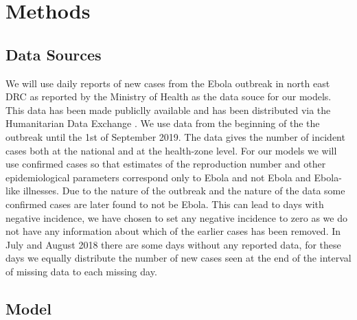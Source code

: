 \documentclass[12pt]{article}
\begin{document}
\section{Methods}

\subsection{Data Sources}

We will use daily reports of new cases from the Ebola outbreak in north east DRC as reported by the Ministry of Health as the data souce for our models. This data has been made publiclly available and has been distributed via the Humanitarian Data Exchange \cite{hummanitariandataexchangeEbolaCasesDeaths}. We use data from the beginning of the the outbreak until the 1st of September 2019. The data gives the number of incident cases both at the national and at the health-zone level. For our models we will use confirmed cases so that estimates of the reproduction number and other epidemiological parameters correspond only to Ebola and not Ebola and Ebola-like illnesses. Due to the nature of the outbreak and the nature of the data some confirmed cases are later found to not be Ebola. This can lead to days with negative incidence, we have chosen to set any negative incidence to zero as we do not have any information about which of the earlier cases has been removed. In July and August 2018 there are some days without any reported data, for these days we equally distribute the number of new cases seen at the end of the interval of missing data to each missing day. 

\subsection{Model}
\end{document}
